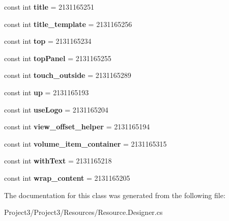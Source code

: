 \begin{DoxyCompactItemize}
\mbox{\label{classXaria_1_1Resource_1_1Id_a9b7c1c8e35df45df69558388ee298f8b}} 
const int {\bfseries title} = 2131165251
\item 
\mbox{\label{classXaria_1_1Resource_1_1Id_ae9c504a9f3d08fc979bcda7a1dbc4c60}} 
const int {\bfseries title\+\_\+template} = 2131165256
\item 
\mbox{\label{classXaria_1_1Resource_1_1Id_aa29e901535992b15a26acc4a3ce7d024}} 
const int {\bfseries top} = 2131165234
\item 
\mbox{\label{classXaria_1_1Resource_1_1Id_af2f94c55b1ea7d6aa2b418f7402d06f4}} 
const int {\bfseries top\+Panel} = 2131165255
\item 
\mbox{\label{classXaria_1_1Resource_1_1Id_acbf7716d12cba1e515340bd0e1c765c6}} 
const int {\bfseries touch\+\_\+outside} = 2131165289
\item 
\mbox{\label{classXaria_1_1Resource_1_1Id_af171f625738154effbe0d99c6d6a69b4}} 
const int {\bfseries up} = 2131165193
\item 
\mbox{\label{classXaria_1_1Resource_1_1Id_a48429402a64936176cb6e32affc36e08}} 
const int {\bfseries use\+Logo} = 2131165204
\item 
\mbox{\label{classXaria_1_1Resource_1_1Id_a10f64f77aaa076f011ffdd2a8a0cfa0d}} 
const int {\bfseries view\+\_\+offset\+\_\+helper} = 2131165194
\item 
\mbox{\label{classXaria_1_1Resource_1_1Id_abfccc1bb1473228fa200698a9047fb10}} 
const int {\bfseries volume\+\_\+item\+\_\+container} = 2131165315
\item 
\mbox{\label{classXaria_1_1Resource_1_1Id_a3b037e94e6ed7d549e0daaa88fb67ad1}} 
const int {\bfseries with\+Text} = 2131165218
\item 
\mbox{\label{classXaria_1_1Resource_1_1Id_a79ab4445bead59c5599e004c866b4e00}} 
const int {\bfseries wrap\+\_\+content} = 2131165205
\end{DoxyCompactItemize}


The documentation for this class was generated from the following file\+:\begin{DoxyCompactItemize}
\item 
Project3/\+Project3/\+Resources/Resource.\+Designer.\+cs\end{DoxyCompactItemize}
